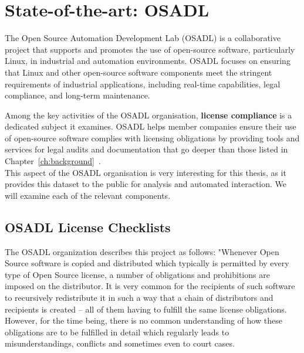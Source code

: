 
\chapter{State-of-the-art: OSADL}\label{ch:related-work}


The Open Source Automation Development Lab (OSADL) is a collaborative project that supports and promotes the use of open-source software, particularly Linux, in industrial and automation environments. OSADL focuses on ensuring that Linux and other open-source software components meet the stringent requirements of industrial applications, including real-time capabilities, legal compliance, and long-term maintenance.

Among the key activities of the OSADL organisation, \textbf{license compliance} is a dedicated subject it examines. OSADL helps member companies ensure their use of open-source software complies with licensing obligations by providing tools and services for legal audits and documentation that go deeper than those listed in Chapter~\ref{ch:background}~\cite{osadl-home}. \\

This aspect of the OSADL organisation is very interesting for this thesis, as it provides this dataset to the public for analysis and automated interaction. We will examine each of the relevant components.

\section{OSADL License Checklists}

The OSADL organization describes this project as follows: "Whenever Open Source software is copied and distributed which typically is permitted by every type of Open Source license, a number of obligations and prohibitions are imposed on the distributor. It is very common for the recipients of such software to recursively redistribute it in such a way that a chain of distributors and recipients is created – all of them having to fulfill the same license obligations. However, for the time being, there is no common understanding of how these obligations are to be fulfilled in detail which regularly leads to misunderstandings, conflicts and sometimes even to court cases.

